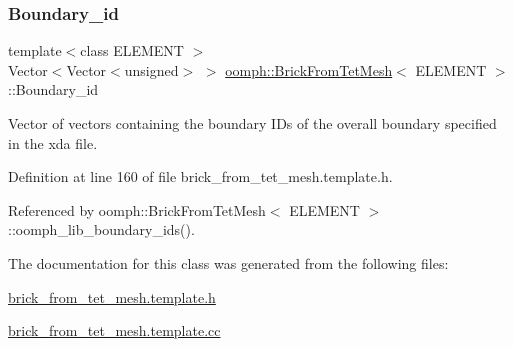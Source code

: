 \subsubsection{\texorpdfstring{Boundary\+\_\+id}{Boundary\_id}}
{\footnotesize\ttfamily template$<$class E\+L\+E\+M\+E\+NT $>$ \\
Vector$<$Vector$<$unsigned$>$ $>$ \hyperlink{classoomph_1_1BrickFromTetMesh}{oomph\+::\+Brick\+From\+Tet\+Mesh}$<$ E\+L\+E\+M\+E\+NT $>$\+::Boundary\+\_\+id\hspace{0.3cm}{\ttfamily [private]}}



Vector of vectors containing the boundary I\+Ds of the overall boundary specified in the xda file. 



Definition at line 160 of file brick\+\_\+from\+\_\+tet\+\_\+mesh.\+template.\+h.



Referenced by oomph\+::\+Brick\+From\+Tet\+Mesh$<$ E\+L\+E\+M\+E\+N\+T $>$\+::oomph\+\_\+lib\+\_\+boundary\+\_\+ids().



The documentation for this class was generated from the following files\+:\begin{DoxyCompactItemize}
\item 
\hyperlink{brick__from__tet__mesh_8template_8h}{brick\+\_\+from\+\_\+tet\+\_\+mesh.\+template.\+h}\item 
\hyperlink{brick__from__tet__mesh_8template_8cc}{brick\+\_\+from\+\_\+tet\+\_\+mesh.\+template.\+cc}\end{DoxyCompactItemize}
